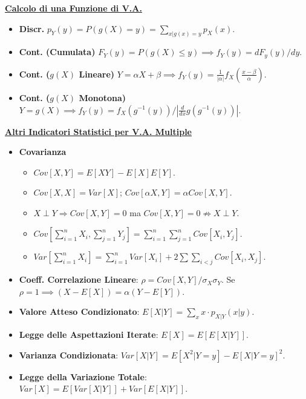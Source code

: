 \documentclass[8pt]{extarticle}
\begin{document}
\begin{multicols*}{3}
    \textbf{\underline{Calcolo di una Funzione di V.A.}}
    \begin{itemize}
        \item \textbf{Discr.} $p_{Y}(y)=P(g(X)=y)=\sum_{x|g(x)=y}p_{X}(x)$.
        \item \textbf{Cont. (Cumulata)} $F_{Y}(y)=P(g(X)\leq y)\implies f_{Y}(y)=dF_{y}(y)/dy$.
        \item \textbf{Cont. ($g(X)$ Lineare)} $Y=\alpha X+\beta\implies f_{Y}(y)=\frac{1}{|\alpha|}f_{X}(\frac{x-\beta}{\alpha})$.
        \item \textbf{Cont. ($g(X)$ Monotona)} $Y=g(X)\implies f_{Y}(y)=f_{X}(g^{-1}(y))/\left|\frac{d}{dx}g(g^{-1}(y))\right|$.
    \end{itemize}

    \textbf{\underline{Altri Indicatori Statistici per V.A. Multiple}}
    \begin{itemize}
        \item \textbf{Covarianza}
              \begin{itemize}
                  \item $Cov[X,Y]=E[XY]-E[X]E[Y]$.
                  \item $Cov[X,X]=Var[X]$; $Cov[\alpha X,Y]=\alpha Cov[X,Y]$.
                  \item $X\perp Y\Rightarrow Cov[X,Y]=0$ ma $Cov[X,Y]=0 \nRightarrow X\perp Y$.
                  \item $Cov[\sum_{i=1}^{n}X_{i},\sum_{j=1}^{n}Y_{j}]=\sum_{i=1}^{n}\sum_{j=1}^{n}Cov[X_{i},Y_{j}]$.
                  \item $Var[\sum_{i=1}^{n}X_{i}]=\sum_{i=1}^{n}Var[X_{i}]+2\sum \sum_{i<j}Cov[X_{i},X_{j}]$.
              \end{itemize}
        \item \textbf{Coeff. Correlazione Lineare}: $\rho =Cov[X,Y]/\sigma_{X}\sigma_{Y}$. Se $\rho=1\implies (X-E[X])=\alpha(Y-E[Y])$.
        \item \textbf{Valore Atteso Condizionato}: $E[X|Y]=\sum_{x}x\cdot p_{X|Y}(x|y)$.
        \item \textbf{Legge delle Aspettazioni Iterate}: $E[X]=E[E[X|Y]]$.
        \item \textbf{Varianza Condizionata}: $Var[X|Y]=E[X^{2}|Y=y]-E[X|Y=y]^{2}$.
        \item \textbf{Legge della Variazione Totale}: $Var[X]=E[Var[X|Y]]+Var[E[X|Y]]$.
    \end{itemize}


\end{multicols*}
\end{document}
